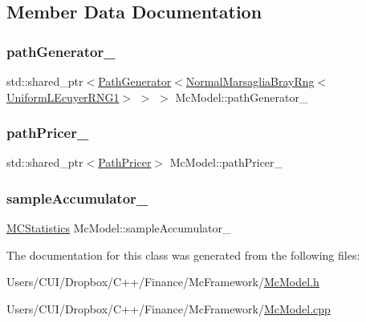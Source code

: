 \subsection{Member Data Documentation}
\hypertarget{class_mc_model_a169810bfa106409ed8bcdba1a5097997}{}\label{class_mc_model_a169810bfa106409ed8bcdba1a5097997} 
\subsubsection{\texorpdfstring{path\+Generator\+\_\+}{pathGenerator\_}}
{\footnotesize\ttfamily std\+::shared\+\_\+ptr$<$\hyperlink{class_path_generator}{Path\+Generator}$<$\hyperlink{class_normal_marsaglia_bray_rng}{Normal\+Marsaglia\+Bray\+Rng}$<$\hyperlink{class_uniform_l_ecuyer_r_n_g1}{Uniform\+L\+Ecuyer\+R\+N\+G1}$>$ $>$ $>$ Mc\+Model\+::path\+Generator\+\_\+\hspace{0.3cm}{\ttfamily [private]}}

\hypertarget{class_mc_model_a8b4390b3abdd1ffdd121a09f141299f9}{}\label{class_mc_model_a8b4390b3abdd1ffdd121a09f141299f9} 
\subsubsection{\texorpdfstring{path\+Pricer\+\_\+}{pathPricer\_}}
{\footnotesize\ttfamily std\+::shared\+\_\+ptr$<$\hyperlink{class_path_pricer}{Path\+Pricer}$>$ Mc\+Model\+::path\+Pricer\+\_\+\hspace{0.3cm}{\ttfamily [private]}}

\hypertarget{class_mc_model_aec19a3ee01c95751a50360d264d51def}{}\label{class_mc_model_aec19a3ee01c95751a50360d264d51def} 
\subsubsection{\texorpdfstring{sample\+Accumulator\+\_\+}{sampleAccumulator\_}}
{\footnotesize\ttfamily \hyperlink{class_m_c_statistics}{M\+C\+Statistics} Mc\+Model\+::sample\+Accumulator\+\_\+\hspace{0.3cm}{\ttfamily [private]}}



The documentation for this class was generated from the following files\+:\begin{DoxyCompactItemize}
\item 
Users/\+C\+U\+I/\+Dropbox/\+C++/\+Finance/\+Mc\+Framework/\hyperlink{_mc_model_8h}{Mc\+Model.\+h}\item 
Users/\+C\+U\+I/\+Dropbox/\+C++/\+Finance/\+Mc\+Framework/\hyperlink{_mc_model_8cpp}{Mc\+Model.\+cpp}\end{DoxyCompactItemize}
